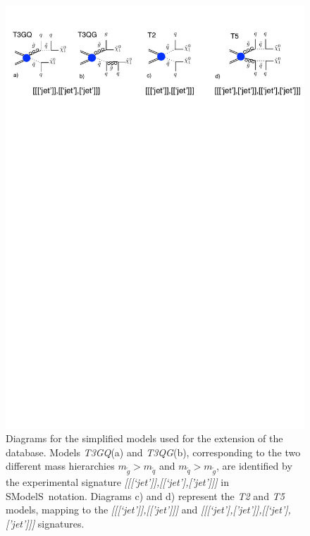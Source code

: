 \documentclass[a4paper,11pt]{article}
\newcommand{\SMO}{{\sc SModelS}}
\begin{document}
\begin{figure}[!]
\begin{center}
\includegraphics[width=1\textwidth]{Figures/Diagrams}
\end{center}
\caption{Diagrams for the simplified models used for the extension of the database. Models \textit{T3GQ}(a) and \textit{T3QG}(b), corresponding to the two different mass hierarchies $m_{\tilde g} > m_{\tilde q}$ and $m_{\tilde q} > m_{\tilde g}$, are identified by the experimental signature \textit{[[[`jet']],[[`jet'],['jet']]]} in \SMO~notation. Diagrams c) and d) represent the \textit{T2} and \textit{T5} models, mapping to the \textit{[[[`jet']],[['jet']]]} and \textit{[[[`jet'],['jet']],[[`jet'],['jet']]]} signatures.}
\label{Diagrams}
\end{figure}
%
\end{document}
